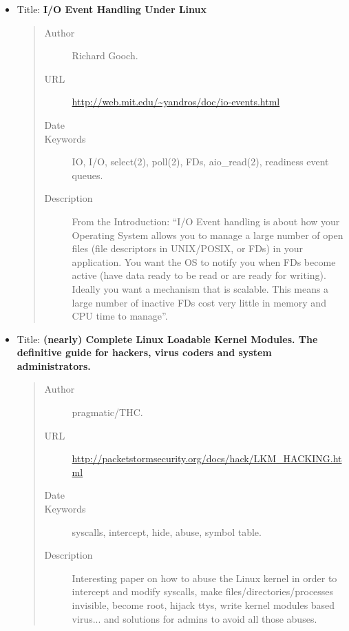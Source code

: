 \documentclass[a4paper,8pt,english]{sphinxmanual}
\begin{document}
\begin{itemize}
\item {} 
Title: \textbf{I/O Event Handling Under Linux}
\begin{quote}\begin{description}
\item[{Author}] \leavevmode
Richard Gooch.

\item[{URL}] \leavevmode
\href{http://web.mit.edu/~yandros/doc/io-events.html}{http://web.mit.edu/\textasciitilde{}yandros/doc/io-events.html}

\item[{Date}] 

\item[{Keywords}] \leavevmode
IO, I/O, select(2), poll(2), FDs, aio\_read(2), readiness
event queues.

\item[{Description}] \leavevmode
From the Introduction: ``I/O Event handling is about
how your Operating System allows you to manage a large number of
open files (file descriptors in UNIX/POSIX, or FDs) in your
application. You want the OS to notify you when FDs become active
(have data ready to be read or are ready for writing). Ideally you
want a mechanism that is scalable. This means a large number of
inactive FDs cost very little in memory and CPU time to manage''.

\end{description}\end{quote}

\item {} 
Title: \textbf{(nearly) Complete Linux Loadable Kernel Modules. The definitive guide for hackers, virus coders and system administrators.}
\begin{quote}\begin{description}
\item[{Author}] \leavevmode
pragmatic/THC.

\item[{URL}] \leavevmode
\href{http://packetstormsecurity.org/docs/hack/LKM\_HACKING.html}{http://packetstormsecurity.org/docs/hack/LKM\_HACKING.html}

\item[{Date}] 

\item[{Keywords}] \leavevmode
syscalls, intercept, hide, abuse, symbol table.

\item[{Description}] \leavevmode
Interesting paper on how to abuse the Linux kernel in
order to intercept and modify syscalls, make
files/directories/processes invisible, become root, hijack ttys,
write kernel modules based virus... and solutions for admins to
avoid all those abuses.


\end{description}
\end{quote}
\end{itemize}
\end{document}
